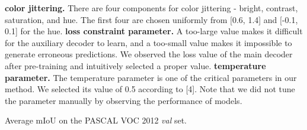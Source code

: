 \documentclass[10pt,twocolumn,letterpaper]{article}
\begin{document}
 \textbf{color jittering.} There are four components for color jittering - bright, contrast, saturation, and hue. The first four are chosen uniformly from [0.6, 1.4] and [-0.1, 0.1] for the hue. \textbf{loss constraint parameter.} A too-large value makes it difficult for the auxiliary decoder to learn, and a too-small value makes it impossible to generate erroneous predictions. We observed the loss value of the main decoder after pre-training and intuitively selected a proper value. \textbf{temperature parameter.} The temperature parameter is one of the critical parameters in our method. We selected its value of 0.5 according to [4]. Note that we did not tune the parameter manually by observing the performance of models.  


\begin{table}
\centering
{} \vspace{-5mm}
\caption{
Average mIoU on the PASCAL VOC 2012 \emph{val} set. 
} \label{sec:avg-res-pascal} 
\vspace{1mm}
 \vspace{-4mm}
\caption{
Average mIoU on the Cityscapes \emph{val} set.
} \vspace{-2mm}
\label{sec:avg-res-city} 
\end{table}
\end{document}
